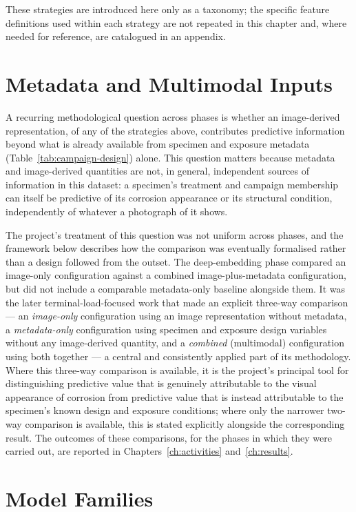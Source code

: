These strategies are introduced here only as a taxonomy; the specific
feature definitions used within each strategy are not repeated in this
chapter and, where needed for reference, are catalogued in an appendix.

\section{Metadata and Multimodal Inputs}
\label{sec:multimodal}

A recurring methodological question across phases is whether an
image-derived representation, of any of the strategies above, contributes
predictive information beyond what is already available from specimen and
exposure metadata (Table~\ref{tab:campaign-design}) alone. This question
matters because metadata and image-derived quantities are not, in
general, independent sources of information in this dataset: a specimen's
treatment and campaign membership can itself be predictive of its
corrosion appearance or its structural condition, independently of
whatever a photograph of it shows.

The project's treatment of this question was not uniform across phases,
and the framework below describes how the comparison was eventually
formalised rather than a design followed from the outset. The
deep-embedding phase compared an image-only configuration against a
combined image-plus-metadata configuration, but did not include a
comparable metadata-only baseline alongside them. It was the later
terminal-load-focused work that made an explicit three-way comparison —
an \emph{image-only} configuration using an image representation without
metadata, a \emph{metadata-only} configuration using specimen and exposure
design variables without any image-derived quantity, and a
\emph{combined} (multimodal) configuration using both together — a
central and consistently applied part of its methodology. Where this
three-way comparison is available, it is the project's principal tool for
distinguishing predictive value that is genuinely attributable to the
visual appearance of corrosion from predictive value that is instead
attributable to the specimen's known design and exposure conditions; where
only the narrower two-way comparison is available, this is stated
explicitly alongside the corresponding result. The outcomes of these
comparisons, for the phases in which they were carried out, are reported
in Chapters~\ref{ch:activities} and~\ref{ch:results}.

\section{Model Families}
\label{sec:model-families}

